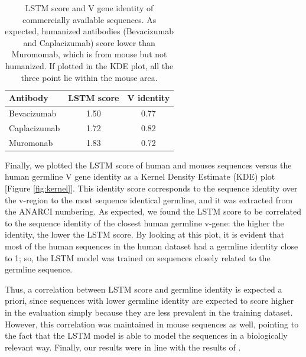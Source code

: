\documentclass[11pt]{article}
\begin{document}
\begin{table}[h]
    \centering
    \begin{tabular}{lcc}
        \toprule
        \textbf{Antibody} & \textbf{LSTM score}     &    \textbf{V identity}   \\
        \midrule
        Bevacizumab       &     1.50             &       0.77   \\
        Caplacizumab      &     1.72             &       0.82   \\
        Muromonab         &     1.83             &       0.72   \\
        \bottomrule
    \end{tabular}
    \caption{\small LSTM score and V gene identity of commercially available sequences. As expected, humanized antibodies (Bevacizumab and Caplacizumab) score lower than Muromomab, which is from mouse but not humanized. If plotted in the KDE plot, all the three point lie within the mouse area.}
    \label{tab:comm_score}
\end{table}


Finally, we plotted the LSTM score of human and mouses sequences versus the human germline V gene identity as a Kernel Density Estimate (KDE) plot [Figure \ref{fig:kernel}]. This identity score corresponds to the sequence identity over the v-region to the most sequence identical germline, and it was extracted from the ANARCI numbering.
As expected, we found the LSTM score to be correlated to the sequence identity of the closest human germline v-gene: the higher the identity, the lower the LSTM score. By looking at this plot, it is evident that most of the human sequences in the human dataset had a germline identity close to 1; 
\nopagebreak[1] so, the LSTM model was trained on sequences closely related to the germline sequence. 

Thus, a correlation between LSTM score and germline identity is expected a priori, since sequences with lower germline identity are expected to score higher in the evaluation simply because they are less prevalent in the training dataset. However, this correlation was maintained in mouse sequences as well, pointing to the fact that the LSTM model is able to model the sequences in a biologically relevant way.
Finally, our results were in line with the results of \cite{LSTM}.
\end{document}

